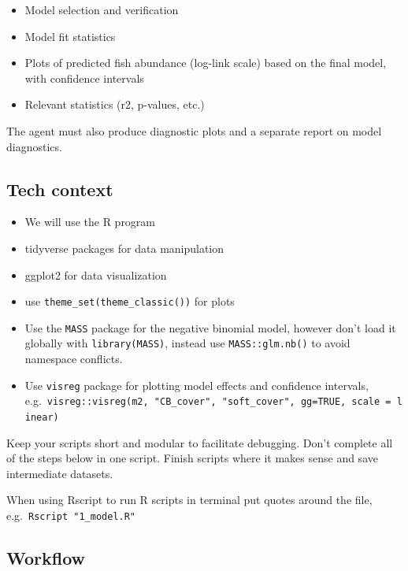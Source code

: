 \documentclass[
  letterpaper,
  DIV=11,
  numbers=noendperiod]{scrreprt}
\providecommand{\tightlist}{%
  \setlength{\itemsep}{0pt}\setlength{\parskip}{0pt}}
\begin{document}
\begin{tcolorbox}
\begin{itemize}
  \begin{itemize}
  \tightlist
  \item
    Model selection and verification
  \item
    Model fit statistics
  \item
    Plots of predicted fish abundance (log-link scale) based on the
    final model, with confidence intervals
  \item
    Relevant statistics (r2, p-values, etc.)
  \end{itemize}
\end{itemize}

The agent must also produce diagnostic plots and a separate report on
model diagnostics.

\subsection{Tech context}\label{tech-context}

\begin{itemize}
\tightlist
\item
  We will use the R program
\item
  tidyverse packages for data manipulation
\item
  ggplot2 for data visualization
\item
  use \texttt{theme\_set(theme\_classic())} for plots
\item
  Use the \texttt{MASS} package for the negative binomial model, however
  don't load it globally with \texttt{library(MASS)}, instead use
  \texttt{MASS::glm.nb()} to avoid namespace conflicts.
\item
  Use \texttt{visreg} package for plotting model effects and confidence
  intervals,
  e.g.~\texttt{visreg::visreg(m2,\ "CB\_cover",\ "soft\_cover",\ gg=TRUE,\ scale\ =\ \textquotesingle{}linear\textquotesingle{})}
\end{itemize}

Keep your scripts short and modular to facilitate debugging. Don't
complete all of the steps below in one script. Finish scripts where it
makes sense and save intermediate datasets.

When using Rscript to run R scripts in terminal put quotes around the
file, e.g.~\texttt{Rscript\ "1\_model.R"}

\subsection{Workflow}\label{workflow}


\end{tcolorbox}
\end{document}
